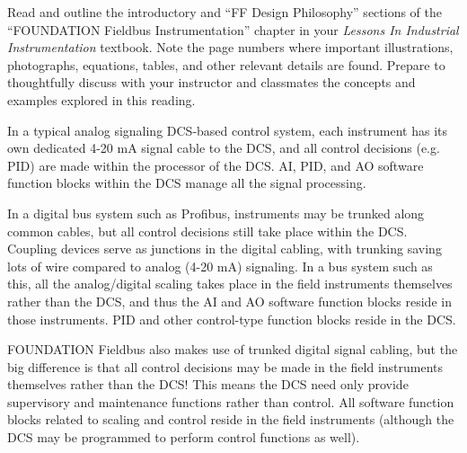 

Read and outline the introductory and ``FF Design Philosophy'' sections of the ``FOUNDATION Fieldbus Instrumentation'' chapter in your {\it Lessons In Industrial Instrumentation} textbook.  Note the page numbers where important illustrations, photographs, equations, tables, and other relevant details are found.  Prepare to thoughtfully discuss with your instructor and classmates the concepts and examples explored in this reading.














In a typical analog signaling DCS-based control system, each instrument has its own dedicated 4-20 mA signal cable to the DCS, and all control decisions (e.g. PID) are made within the processor of the DCS.  AI, PID, and AO software function blocks within the DCS manage all the signal processing.

\vskip 10pt

In a digital bus system such as Profibus, instruments may be trunked along common cables, but all control decisions still take place within the DCS.  Coupling devices serve as junctions in the digital cabling, with trunking saving lots of wire compared to analog (4-20 mA) signaling.  In a bus system such as this, all the analog/digital scaling takes place in the field instruments themselves rather than the DCS, and thus the AI and AO software function blocks reside in those instruments.  PID and other control-type function blocks reside in the DCS.

\vskip 10pt

FOUNDATION Fieldbus also makes use of trunked digital signal cabling, but the big difference is that all control decisions may be made in the field instruments themselves rather than the DCS!  This means the DCS need only provide supervisory and maintenance functions rather than control.  All software function blocks related to scaling and control reside in the field instruments (although the DCS may be programmed to perform control functions as well).

